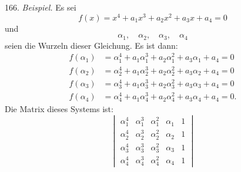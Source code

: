 \documentclass[11pt]{article}
\providecommand{\weq}[2]{\begin{equation}\tag{#1}#2\end{equation}}
\begin{document}
166. \textit{Beispiel.} Es sei
\[
f(x) = x^4 + a_1 x^3 + a_2 x^2 + a_3 x + a_4 = 0
\]
und
\[
\alpha_1, \quad \alpha_2, \quad \alpha_3, \quad \alpha_4
\]
seien die Wurzeln dieser Gleichung. Es ist dann:
\[
\begin{aligned}
f(\alpha_1) &= \alpha_1^4 + a_1\alpha_1^3 + a_2\alpha_1^2 + a_3\alpha_1 + a_4 = 0 \\
f(\alpha_2) &= \alpha_2^4 + a_1\alpha_2^3 + a_2\alpha_2^2 + a_3\alpha_2 + a_4 = 0 \\
f(\alpha_3) &= \alpha_3^4 + a_1\alpha_3^3 + a_2\alpha_3^2 + a_3\alpha_3 + a_4 = 0 \\
f(\alpha_4) &= \alpha_4^4 + a_1\alpha_4^3 + a_2\alpha_4^2 + a_3\alpha_4 + a_4 = 0.
\end{aligned}
\]
Die Matrix dieses Systems ist:
\weq{A}{
\begin{vmatrix}
\alpha_1^{4} & \alpha_1^{3} & \alpha_1^{2} & \alpha_1 & 1 \\
\alpha_2^{4} & \alpha_2^{3} & \alpha_2^{2} & \alpha_2 & 1 \\
\alpha_3^{4} & \alpha_3^{3} & \alpha_3^{2} & \alpha_3 & 1 \\
\alpha_4^{4} & \alpha_4^{3} & \alpha_4^{2} & \alpha_4 & 1
\end{vmatrix}
}
\end{document}
